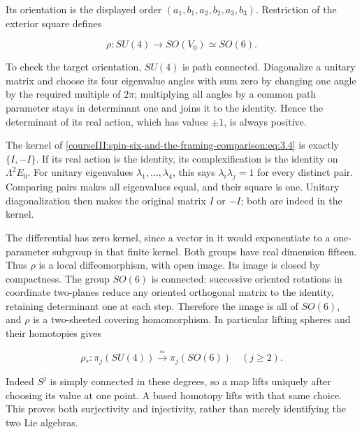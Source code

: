 Its orientation is the displayed order \((a_1,b_1,a_2,b_2,a_3,b_3)\). Restriction of the exterior square defines

\begin{equation}
\rho:SU(4)\longrightarrow SO(V_0)\simeq SO(6).
\label{courseIII:spin-six-and-the-framing-comparison:eq:3.4}
\end{equation}

To check the target orientation, \(SU(4)\) is path connected. Diagonalize a unitary matrix and choose its four eigenvalue angles with sum zero by changing one angle by the required multiple of \(2\pi\); multiplying all angles by a common path parameter stays in determinant one and joins it to the identity. Hence the determinant of its real action, which has values \(\pm1\), is always positive.

The kernel of \eqref{courseIII:spin-six-and-the-framing-comparison:eq:3.4} is exactly \(\{I,-I\}\). If its real action is the identity, its complexification is the identity on \(\Lambda^2E_0\). For unitary eigenvalues \(\lambda_1,\ldots,\lambda_4\), this says \(\lambda_i\lambda_j=1\) for every distinct pair. Comparing pairs makes all eigenvalues equal, and their square is one. Unitary diagonalization then makes the original matrix \(I\) or \(-I\); both are indeed in the kernel.

The differential has zero kernel, since a vector in it would exponentiate to a one-parameter subgroup in that finite kernel. Both groups have real dimension fifteen. Thus \(\rho\) is a local diffeomorphism, with open image. Its image is closed by compactness. The group \(SO(6)\) is connected: successive oriented rotations in coordinate two-planes reduce any oriented orthogonal matrix to the identity, retaining determinant one at each step. Therefore the image is all of \(SO(6)\), and \(\rho\) is a two-sheeted covering homomorphism. In particular lifting spheres and their homotopies gives

\begin{equation}
\rho_*:\pi_j(SU(4))\xrightarrow{\ \simeq\ }\pi_j(SO(6))
\quad(j\geq2).
\label{courseIII:spin-six-and-the-framing-comparison:eq:3.5}
\end{equation}

Indeed \(S^j\) is simply connected in these degrees, so a map lifts uniquely after choosing its value at one point. A based homotopy lifts with that same choice. This proves both surjectivity and injectivity, rather than merely identifying the two Lie algebras.

